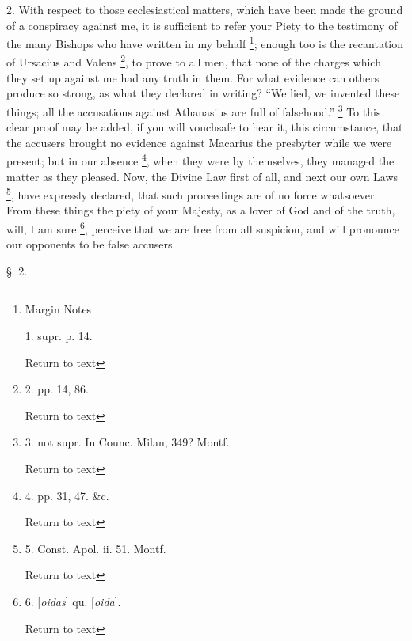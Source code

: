 2. With respect to those ecclesiastical matters, which have been made
the ground of a conspiracy against me, it is sufficient to refer your
Piety to the testimony of the many Bishops who have written in my
behalf \footnote{Margin Notes

1. supr. p. 14.

Return to text}; enough too is
the recantation of Ursacius and Valens \footnote{2. pp. 14, 86.

Return to text}, to prove to all men, that none of the charges which they set
up against me had any truth in them. For what evidence can others
produce so strong, as what they declared in writing? ``We lied, we
invented these things; all the accusations against Athanasius are full
of falsehood.'' \footnote{3. not supr. In Counc. Milan, 349? Montf.

Return to text} To this
clear proof may be added, if you will vouchsafe to hear it, this
circumstance, that the accusers brought no evidence against Macarius
the presbyter while we were present; but in our absence \footnote{4. pp. 31, 47. \&c.

Return to text}, when they were by themselves, they managed the matter as they
pleased. Now, the Divine Law first of all, and next our own Laws \footnote{5. Const. Apol. ii. 51. Montf.

Return to text}, have expressly declared, that such proceedings are of no force
whatsoever. From these things the piety of your Majesty, as a lover of
God and of the truth, will, I am sure \footnote{6. [\emph{oidas}] qu. [\emph{oida}].

Return to text}, perceive that we are free from all suspicion, and will
pronounce our opponents to be false accusers.

§. 2.

